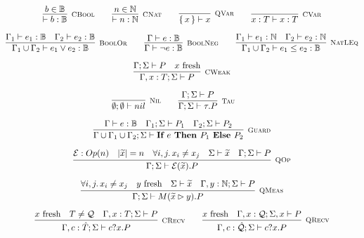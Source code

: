 \begin{gather*}
\infer[\mbox{\footnotesize\scshape CBool}]{\vdash b : \mathbb{B}}{b \in \mathbb{B}} \qquad
\infer[\mbox{\footnotesize\scshape CNat}]{\vdash n : \mathbb{N}}{n \in \mathbb{N}} \qquad
\infer[\mbox{\footnotesize\scshape QVar}]{\set{x} \vdash x}{} \qquad
\infer[\mbox{\footnotesize\scshape CVar}]{x : T \vdash x : T}{} \\[0.2cm]
\infer[\mbox{\footnotesize\scshape BoolOr}]{\Gamma_1 \cup \Gamma_2 \vdash e_1 \lor e_2 : \mathbb{B}}{\Gamma_1 \vdash e_1 : \mathbb{B} & \Gamma_2 \vdash e_2 : \mathbb{B}} \qquad
\infer[\mbox{\footnotesize\scshape BoolNeg}]{\Gamma \vdash \neg e : \mathbb{B}}{\Gamma \vdash e : \mathbb{B}} \qquad
\infer[\mbox{\footnotesize\scshape NatLEq}]{\Gamma_1 \cup \Gamma_2 \vdash e_1 \leq e_2 : \mathbb{B}}{\Gamma_1 \vdash e_1 : \mathbb{N} & \Gamma_2 \vdash e_2 : \mathbb{N}} \\[0.2cm]
 \infer[\mbox{\footnotesize\scshape CWeak}]{\Gamma, x : T; \Sigma \vdash P}{\Gamma; \Sigma \vdash P & \text{$x$ fresh}} \\[0.2cm]
\infer[\mbox{\footnotesize\scshape Nil}]{\emptyset; \emptyset \vdash nil}{} \qquad
\infer[\mbox{\footnotesize\scshape Tau}]{\Gamma; \Sigma \vdash \tau . P}{ \Gamma; \Sigma \vdash P} \qquad
\\[0.2cm]
\infer[\mbox{\footnotesize\scshape Guard}]{\Gamma \cup \Gamma_1 \cup \Gamma_2; \Sigma \vdash \ITE{e}{P_1}{P_2}}{\Gamma \vdash e : \mathbb{B} & \Gamma_1; \Sigma \vdash P_1 & \Gamma_2; \Sigma \vdash P_2} \\[0.2cm]
\infer[\mbox{\footnotesize\scshape QOp}]
{\Gamma; \Sigma \vdash \mathcal{E}(\widetilde{x}) . P}
{\mathcal{E}: Op(n) & |\widetilde{x}| = n & \forall i, j \ldotp x_i \neq x_j & \Sigma \vdash \widetilde{x} & \Gamma; \Sigma \vdash P} \\[0.2cm]
\infer[\mbox{\footnotesize\scshape QMeas}]{\Gamma; \Sigma \vdash M(\widetilde{x} \rhd y) . P}
{\forall i, j \ldotp x_i \neq x_j & \text{$y$ fresh} & \Sigma \vdash \widetilde{x} & \Gamma, y : \mathbb{N}; \Sigma \vdash P} \\[0.2cm]
\infer[\mbox{\footnotesize\scshape CRecv}]
{\Gamma, c : \hat{T}; \Sigma \vdash c?x . P}
{\text{$x$ fresh} & T \neq \mathcal{Q} & \Gamma, x : T; \Sigma \vdash P} 
\qquad
\infer[\mbox{\footnotesize\scshape QRecv}]
{\Gamma, c : \hat{\mathcal{Q}}; \Sigma \vdash c?x . P}
{\text{$x$ fresh} & \Gamma, x : \mathcal{Q}; \Sigma, x \vdash P} 

\end{gather*}
